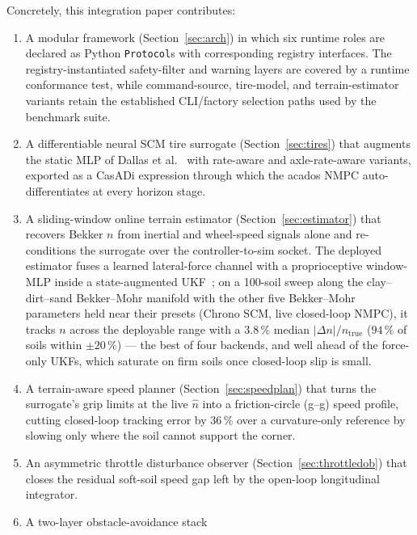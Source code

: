 \documentclass[conference,letterpaper,10pt]{IEEEtran}
\begin{document}
Concretely, this integration paper contributes:
\begin{enumerate}
  \item A modular framework (Section~\ref{sec:arch}) in which six
        runtime roles are declared as Python \texttt{Protocol}s with
        corresponding registry interfaces. The registry-instantiated
        safety-filter and warning layers are covered by a runtime
        conformance test, while command-source, tire-model, and
        terrain-estimator variants retain the established CLI/factory
        selection paths used by the benchmark suite.
  \item A differentiable neural SCM tire surrogate
        (Section~\ref{sec:tires}) that augments the static MLP of
        Dallas et al.~\cite{Dallas21} with rate-aware and
        axle-rate-aware variants, exported as a CasADi expression
        through which the acados NMPC auto-differentiates at every
        horizon stage.
  \item A sliding-window online terrain estimator
        (Section~\ref{sec:estimator}) that recovers Bekker $n$ from
        inertial and wheel-speed signals alone and re-conditions the
        surrogate over the controller-to-sim socket. The deployed
        estimator fuses a learned lateral-force channel with a
        proprioceptive window-MLP inside a state-augmented
        UKF~\cite{Dallas21}; on a 100-soil sweep along the
        clay--dirt--sand Bekker--Mohr manifold with the other five
        Bekker--Mohr parameters held near their presets (Chrono SCM, live
        closed-loop NMPC), it tracks $n$ across the deployable
        range with a $3.8\,\%$ median $|\Delta n|/n_{\mathrm{true}}$
        ($94\,\%$ of soils within $\pm 20\,\%$) --- the best of four
        backends, and well ahead of the force-only UKFs, which
        saturate on firm soils once closed-loop slip is small.
  \item A terrain-aware speed planner (Section~\ref{sec:speedplan})
        that turns the surrogate's grip limits at the live $\hat n$ into
        a friction-circle (g--g) speed profile, cutting closed-loop
        tracking error by $36\,\%$ over a curvature-only reference by
        slowing only where the soil cannot support the corner.
  \item An asymmetric throttle disturbance observer
        (Section~\ref{sec:throttledob}) that closes the residual
        soft-soil speed gap left by the open-loop longitudinal
        integrator.
  \item A two-layer obstacle-avoidance stack

\end{enumerate}
\end{document}
